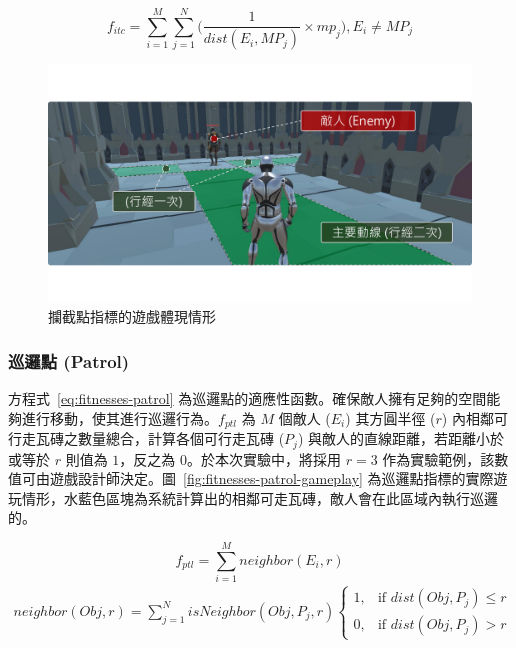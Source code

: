 \begin{equation}
    \label{eq:fitnesses-intercept}
    f_{itc} = \sum_{i=1}^{M} \sum_{j=1}^{N} \Big( \frac{1}{dist(E_{i}, MP_{j})} \times mp_{j} \Big), 
    E_{i} \neq MP_{j}
\end{equation}

\begin{figure}[!htb]
  \begin{center}
    \includegraphics[width=1.0\textwidth]{figures/fitnesses-intercept-gameplay.pdf}
    \caption{攔截點指標的遊戲體現情形}
    \label{fig:fitnesses-intercept-gameplay}
  \end{center}
\end{figure}

\subsubsection{巡邏點 (Patrol)}
\label{sssec:method-segments-fitnesses-patrol}

方程式~\ref{eq:fitnesses-patrol} 為巡邏點的適應性函數。確保敵人擁有足夠的空間能夠進行移動，使其進行巡邏行為。$f_{ptl}$ 為 $M$ 個敵人 ($E_{i}$) 其方圓半徑 ($r$) 內相鄰可行走瓦磚之數量總合，計算各個可行走瓦磚 ($P_{j}$) 與敵人的直線距離，若距離小於或等於 $r$ 則值為 $1$，反之為 $0$。於本次實驗中，將採用 $r=3$ 作為實驗範例，該數值可由遊戲設計師決定。圖~\ref{fig:fitnesses-patrol-gameplay} 為巡邏點指標的實際遊玩情形，水藍色區塊為系統計算出的相鄰可走瓦磚，敵人會在此區域內執行巡邏的。

\begin{equation}
    \label{eq:fitnesses-patrol}
    f_{ptl} = \sum_{i=1}^{M} neighbor(E_i, r)
\end{equation}
\begin{gather*}
    neighbor(Obj, r) = \sum_{j=1}^{N} isNeighbor(Obj, P_{j}, r)
      \begin{cases}
        1, & \mbox{if } dist(Obj, P_{j}) \leq r \\
        0, & \mbox{if } dist(Obj, P_{j}) > r
      \end{cases}
\end{gather*}

